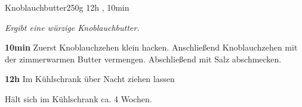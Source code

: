 \documentclass[../recipe-collections/cooking.tex]{subfiles}
\begin{document}
\begin{recipe}{Knoblauchbutter}{250g }{12h , 10min }

  \freeform{}\textit{Ergibt eine würzige Knoblauchbutter.}


  \textbf{10min}
  Zuerst Knoblauchzehen klein hacken.
  Anschließend Knoblauchzehen mit der zimmerwarmen Butter vermengen.
  Abschließend mit Salz abschmecken.

  \newstep{}\textbf{12h}
  Im Kühlschrank über Nacht ziehen lassen

  \freeform{}\hrulefill{}

  \freeform{}
  Hält sich im Kühlschrank ca. 4 Wochen.

\end{recipe}
\end{document}
